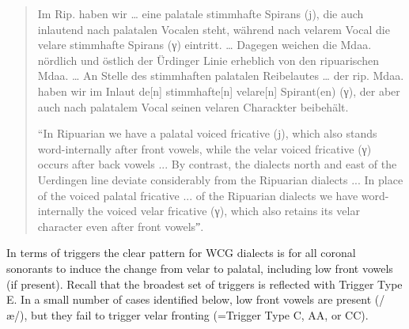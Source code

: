 \begin{quote}
Im Rip. haben wir … eine palatale stimmhafte Spirans (j), die auch inlautend nach palatalen Vocalen steht, während nach velarem Vocal die velare stimmhafte Spirans (γ) eintritt. … Dagegen weichen die Mdaa. nördlich und östlich der Ürdinger Linie erheblich von den ripuarischen Mdaa. … An Stelle des stimmhaften palatalen Reibelautes … der rip. Mdaa. haben wir im Inlaut de[n] stimmhafte[n] velare[n] Spirant(en) (γ), der aber auch nach palatalem Vocal seinen velaren Charackter beibehält.

“In Ripuarian we have a palatal voiced fricative (j), which also stands word-internally after front vowels, while the velar voiced fricative (γ) occurs after back vowels ... By contrast, the dialects north and east of the Uerdingen line deviate considerably from the Ripuarian dialects ... In place of the voiced palatal fricative ... of the Ripuarian dialects we have word-internally the voiced velar fricative (γ), which also retains its velar character even after front vowelsˮ.
\end{quote}

In terms of triggers the clear pattern for WCG dialects is for all coronal sonorants to induce the change from velar to palatal, including low front vowels (if present). Recall that the broadest set of triggers is reflected with Trigger Type E. In a small number of cases identified below, low front vowels are present (/æ/), but they fail to trigger velar fronting (=Trigger Type C, AA, or CC).

